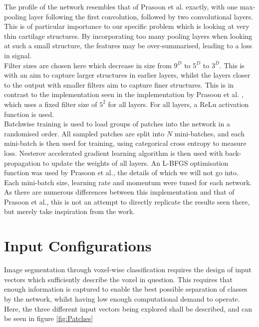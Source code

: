\documentclass[11pt,a4paper]{memoir}
\numberwithin{figure}{section}
\numberwithin{table}{section}
\numberwithin{equation}{section}
\begin{document}
The profile of the network resembles that of Prasoon et al. exactly, with one max-pooling layer following the first convolution, followed by two convolutional layers. This is of particular importance to our specific problem which is looking at very thin cartilage structures. By incorporating too many pooling layers when looking at such a small structure, the features may be over-summarised, leading to a loss in signal.  \\
 
Filter sizes are chosen here which decrease in size from $9^{D}$ to $5^{D}$ to $3^{D}$. This is with an aim to capture larger structures in earlier layers, whilst the layers closer to the output with smaller filters aim to capture finer structures. This is in contrast to the implementation seen in the implementation by Prasoon et al. \cite{Prasoon2013DeepNetwork}, which uses a fixed filter size of $5^{2}$ for all layers. For all layers, a ReLu activation function is used. \\

Batchwise training is used to load groups of patches into the network in a randomised order. All sampled patches are split into $N$ mini-batches, and each mini-batch is then used for training, using categorical cross entropy to measure loss. Nesterov accelerated gradient learning algorithm is then used with back-propagation to update the weights of all layers. An L-BFGS optimisation function was used by Prasoon et al., the details of which we will not go into. Each mini-batch size, learning rate and momentum were tuned for each network.\\

As there are numerous differences between this implementation and that of Prasoon et al., this is not an attempt to directly replicate the results seen there, but merely take inspiration from the work.

\section{Input Configurations}
Image segmentation through voxel-wise classification requires the design of input vectors which sufficiently describe the voxel in question. This requires that enough information is captured to enable the best possible separation of classes by the network, whilst having low enough computational demand to operate. Here, the three different input vectors being explored shall be described, and can be seen in figure \ref{fig:Patches}
\end{document}

